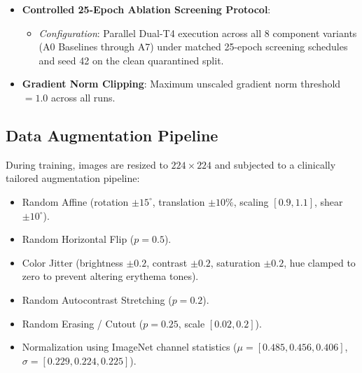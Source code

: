 \documentclass[journal]{IEEEtran}
\begin{document}
\begin{itemize}
\begin{itemize}
    \end{itemize}
    \item \textbf{Controlled 25-Epoch Ablation Screening Protocol}:
    \begin{itemize}
        \item \textit{Configuration}: Parallel Dual-T4 execution across all 8 component variants (A0 Baselines through A7) under matched 25-epoch screening schedules and seed 42 on the clean quarantined split.
    \end{itemize}
    \item \textbf{Gradient Norm Clipping}: Maximum unscaled gradient norm threshold $= 1.0$ across all runs.
\end{itemize}

\subsection{Data Augmentation Pipeline}
During training, images are resized to $224 \times 224$ and subjected to a clinically tailored augmentation pipeline:
\begin{itemize}
    \item Random Affine (rotation $\pm 15^\circ$, translation $\pm 10\%$, scaling $[0.9, 1.1]$, shear $\pm 10^\circ$).
    \item Random Horizontal Flip ($p = 0.5$).
    \item Color Jitter (brightness $\pm 0.2$, contrast $\pm 0.2$, saturation $\pm 0.2$, hue clamped to zero to prevent altering erythema tones).
    \item Random Autocontrast Stretching ($p = 0.2$).
    \item Random Erasing / Cutout ($p = 0.25$, scale $[0.02, 0.2]$).
    \item Normalization using ImageNet channel statistics ($\mu = [0.485, 0.456, 0.406]$, $\sigma = [0.229, 0.224, 0.225]$).
\end{itemize}
\end{document}

